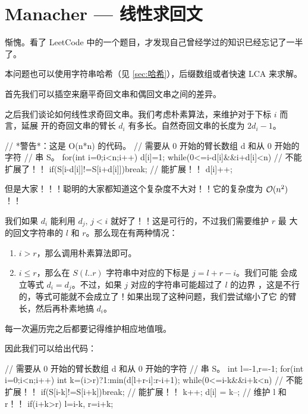 \section{Manacher --- 线性求回文}

惭愧。看了 LeetCode 中的一个题目，才发现自己曾经学过的知识已经忘记了一半了。

本问题也可以使用字符串哈希（见 \ref{sec:哈希}），后缀数组或者快速 LCA 来求解。

首先我们可以插空来磨平奇回文串和偶回文串之间的差异。

之后我们谈论如何线性求奇回文串。我们考虑朴素算法，来维护对于下标 $i$ 而言，延展
开的奇回文串的臂长 $d_i$ 有多长。自然奇回文串的长度为 $2 d_i - 1$。
\begin{Cpp}
// *警告*：这是 O(n*n) 的代码。
// 需要从 0 开始的臂长数组 d 和从 0 开始的字符
// 串 S。
{
  for(int i=0;i<n;i++){
    d[i]=1;
    while(0<=i-d[i]&&i+d[i]<n){
      // 不能扩展了！！
      if(S[i-d[i]]!=S[i+d[i]])break;
      // 能扩展！！
      d[i]++;
    }
  }
}
\end{Cpp}

但是大家！！！聪明的大家都知道这个复杂度不大对！！它的复杂度为 $\mathcal{O}(n^2)$！！

我们如果 $d_i$ 能利用 $d_j,\, j<i$ 就好了！！这是可行的，不过我们需要维护 $r$ 最
大的回文字符串的 $l$ 和 $r$。那么现在有两种情况：
\begin{enumerate}
    \item $i > r$，那么调用朴素算法即可。
    \item $i \le r$，那么在 $S(l..r)$ 字符串中对应的下标是 $j = l + r - i$。我们可能
        会成立等式 $d_i = d_j$。不过，如果 $j$ 对应的字符串可能超过了 $l$ 的边界
        ，这是不行的，等式可能就不会成立了！如果出现了这种问题，我们尝试缩小了它
        的臂长，然后再朴素地搞 $d_i$。
\end{enumerate}

每一次遍历完之后都要记得维护相应地值哦。

因此我们可以给出代码：
\begin{Cpp}
// 需要从 0 开始的臂长数组 d 和从 0 开始的字符
// 串 S。
{
  int l=-1,r=-1;
  for(int i=0;i<n;i++){
    int k=(i>r)?1:min(d[l+r-i]:r-i+1);
    while(0<=i-k&&i+k<n){
      // 不能扩展！！
      if(S[i-k]!=S[i+k])break;
      // 能扩展！！
      k++;
    }
    d[i] = k--;
    // 维护 l 和 r！！
    if(i+k>r) l=i-k, r=i+k;
  }
}
\end{Cpp}
